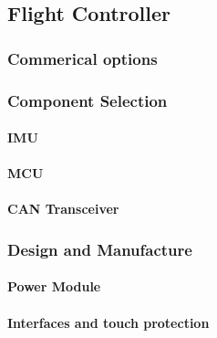 \subsection{Flight Controller}

\subsubsection{Commerical options}

\subsubsection{Component Selection}
\paragraph{\gls{IMU}}
\paragraph{\gls{MCU}}
\paragraph{\gls{CAN} Transceiver}

\subsubsection{Design and Manufacture}
\paragraph{Power Module}
\paragraph{Interfaces and touch protection}
